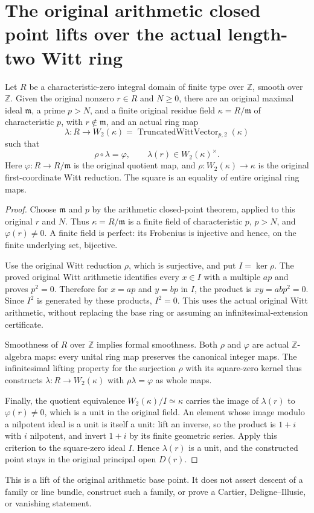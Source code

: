 \section{The original arithmetic closed point lifts over the actual length-two Witt ring}

\begin{theorem}
\label{thm:arithmetic-original-closed-point-witt-lift}
\leanok
{}
Let $R$ be a characteristic-zero integral domain of finite type over
$\mathbb Z$, smooth over $\mathbb Z$. Given the original nonzero
$r\in R$ and $N\ge0$, there are an original maximal ideal $\mathfrak m$,
a prime $p>N$, and a finite original residue field $\kappa=R/\mathfrak m$
of characteristic $p$, with $r\notin\mathfrak m$, and an actual ring map
\[
 \lambda:R\longrightarrow W_2(\kappa)
   =\operatorname{TruncatedWittVector}_{p,2}(\kappa)
\]
such that
\[
 \rho\circ\lambda=\varphi,
 \qquad \lambda(r)\in W_2(\kappa)^\times.
\]
Here $\varphi:R\to R/\mathfrak m$ is the original quotient map, and
$\rho:W_2(\kappa)\to\kappa$ is the original first-coordinate Witt
reduction. The square is an equality of entire original ring maps.
\end{theorem}
\begin{proof}
Choose $\mathfrak m$ and $p$ by the arithmetic closed-point theorem,
applied to this original $r$ and $N$. Thus $\kappa=R/\mathfrak m$ is a
finite field of characteristic $p$, $p>N$, and $\varphi(r)\ne0$.
A finite field is perfect: its Frobenius is injective and hence, on the
finite underlying set, bijective.

Use the original Witt reduction $\rho$, which is surjective, and put
$I=\ker\rho$. The proved original Witt arithmetic identifies every
$x\in I$ with a multiple $ap$ and proves $p^2=0$. Therefore for
$x=ap$ and $y=bp$ in $I$, the product is
$xy=abp^2=0$. Since $I^2$ is generated by these products, $I^2=0$.
This uses the actual original Witt arithmetic, without replacing the
base ring or assuming an infinitesimal-extension certificate.

Smoothness of $R$ over $\mathbb Z$ implies formal smoothness. Both
$\rho$ and $\varphi$ are actual $\mathbb Z$-algebra maps: every unital
ring map preserves the canonical integer maps. The infinitesimal lifting
property for the surjection $\rho$ with its square-zero kernel thus
constructs $\lambda:R\to W_2(\kappa)$ with
$\rho\lambda=\varphi$ as whole maps.

Finally, the quotient equivalence
$W_2(\kappa)/I\simeq\kappa$ carries the image of $\lambda(r)$ to
$\varphi(r)\ne0$, which is a unit in the original field. An element
whose image modulo a nilpotent ideal is a unit is itself a unit: lift an
inverse, so the product is $1+i$ with $i$ nilpotent, and invert $1+i$
by its finite geometric series. Apply this criterion to the square-zero
ideal $I$. Hence $\lambda(r)$ is a unit, and the constructed point
stays in the original principal open $D(r)$.
\end{proof}

This is a lift of the original arithmetic base point. It does not assert
descent of a family or line bundle, construct such a family, or prove a
Cartier, Deligne--Illusie, or vanishing statement.
